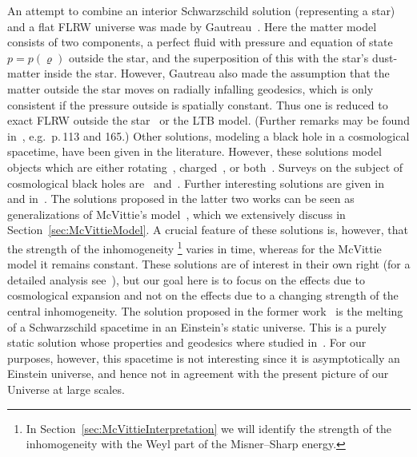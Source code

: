 \documentclass
[rmp,aps,twocolumn,showpacs,preprintnumbers,amsmath,amssymb]{revtex4}
\theoremstyle{plain}
\theoremstyle{definition}
\theoremstyle{remark}
\begin{document}
An attempt to combine an interior Schwarzschild solution (representing a 
star) and a flat FLRW universe was made by Gautreau~\cite{Gautreau:1984b}.
Here the matter model consists of two components, a perfect fluid 
with pressure and equation of state $p=p(\varrho)$ outside the star, 
and the superposition of this with the star's dust-matter inside 
the star. However, Gautreau also made the assumption that the matter 
outside the star moves on radially infalling geodesics, which is only 
consistent if the pressure outside is spatially constant. Thus one 
is reduced to exact FLRW outside the star~\cite{vdBergh.Wils:1984} 
or the LTB model. (Further remarks may be found in~\cite{Krasinski:1998}, 
e.g.~p.\,113 and 165.) Other solutions, modeling a black hole in a 
cosmological spacetime, have been given in the literature. However, these 
solutions model objects which are either 
rotating~\cite{Vaidya:1977,Vaidya:1984,Ramachandra.etal:2003}, 
charged~\cite{Gao.Zhang:2004}, or both~\cite{Patel.Trivedi:1982}. 
Surveys on the subject of cosmological black holes 
are~\cite{Vishveshwara:2000} and~\cite{McClure:2006}. 
Further interesting solutions are given in~\cite{RajeshNayak.etal:2001} 
and in~\cite{Sultana.Dyer:2005,Faraoni.Jacques:2007}. The solutions 
proposed in the latter two works can be seen as generalizations of 
McVittie's model~\cite{McVittie:1933}, which we extensively discuss in 
Section~\ref{sec:McVittieModel}. A crucial feature of these solutions is, 
however, that the strength of the inhomogeneity%
\footnote{In Section~\ref{sec:McVittieInterpretation} we will identify the 
strength of the inhomogeneity with the Weyl part of the Misner--Sharp energy.}
varies in time, whereas for the McVittie model it remains constant. 
These solutions are of interest in their own right (for a detailed analysis 
see~\cite{Carrera.Giulini:2009a}), but our goal here is to focus on the 
effects due to cosmological expansion and not on the effects due to a 
changing strength of the central inhomogeneity. 
The solution proposed in the former work~\cite{RajeshNayak.etal:2001} is 
the melting of a Schwarzschild spacetime in an Einstein's static universe. 
This is a purely static solution whose properties and geodesics where studied 
in~\cite{Ramachandra.Vishveshwara:2002}. For our purposes, however, this 
spacetime is not interesting since it is asymptotically an Einstein universe, 
and hence not in agreement with the present picture of our Universe at large 
scales.

\end{document}
